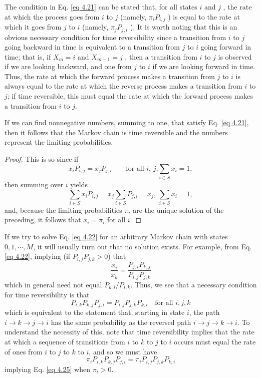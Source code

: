 The condition in Eq. \eqref{eq 4.21} can be stated that, for all states $i$ and $j$ , the rate at which the process goes from $i$ to $j$ (namely, $\pi_i P_{i,j}$ ) is equal to the rate at which it goes from $j$
to $i$ (namely, $\pi_j P_{j,i}$ ). It is worth noting that this is an obvious necessary condition for
time reversibility since a transition from $i$ to $j$ going backward in time is equivalent to
a transition from $j$ to $i$ going forward in time; that is, if $X_m = i$ and $X_{m−1} = j$ , then
a transition from $i$ to $j$ is observed if we are looking backward, and one from $j$ to $i$ if
we are looking forward in time. Thus, the rate at which the forward process makes a transition from $j$ to $i$ is always equal to the rate at which the reverse process makes a transition from $i$ to $j$; if time reversible, this must equal the rate at which the forward
process makes a transition from $i$ to $j$.

\begin{proposition}
    If we can find nonnegative numbers, summing to one, that satisfy Eq. \eqref{eq 4.21}, then it follows that the Markov chain is time reversible and the numbers represent the limiting probabilities.
    \begin{proof}
        This is so since if
        \begin{equation}\label{eq 4.22}
            x_i P_{i,j} = x_j P_{j,i} \qquad \text{for all $i$, $j$,} 
            \sum_{i \in S} x_i = 1 ,
        \end{equation}
        then summing over $i$ yields 
        $$
        \sum_{i\in S} x_i P_{i,j} = x_j \sum_{i \in S} P_{j, i} = x_j, \, \sum_{i \in S} x_i = 1,$$
        and, because the limiting probabilities $\pi_i$ are the unique solution of the preceding, it follows that $x_i = \pi_i$ for all $i$.
    \end{proof}
\end{proposition}

If we try to solve Eq. \eqref{eq 4.22} for an arbitrary Markov chain with states $0, 1, \cdots , M$,
it will usually turn out that no solution exists. For example, from Eq. \eqref{eq 4.22}, implying (if $P_{i,j}P_{j,k} > 0$) that
$$
\frac{x_i}{x_k} = \frac{P_{j,i}P_{k,j}}{P_{i,j}P_{j,k}}
$$
which in general need not equal $P_{k,i}/P_{i,k}$. Thus, we see that a necessary condition for time reversibility is that 
\begin{equation}\label{eq 4.25}
P_{i,k} P_{k,j} P_{j,i} = P_{i,j} P_{j,k} P_{k,i} \quad \text{for all $i,j,k$}
\end{equation}
which is equivalent to the statement that, starting in state $i$, the path $i \to k \to j \to i$
has the same probability as the reversed path $i \to j \to k \to i$. To understand the
necessity of this, note that time reversibility implies that the rate at which a sequence
of transitions from $i$ to $k$ to $j$ to $i$ occurs must equal the rate of ones from $i$ to $j$ to $k$
to $i$, and so we must have
$$
\pi_i P_{i,k} P_{k,j} P_{j,i} = \pi_i P_{i,j} P_{j,k} P_{k,i}
$$
implying Eq. \eqref{eq 4.25} when $\pi_i > 0$.

